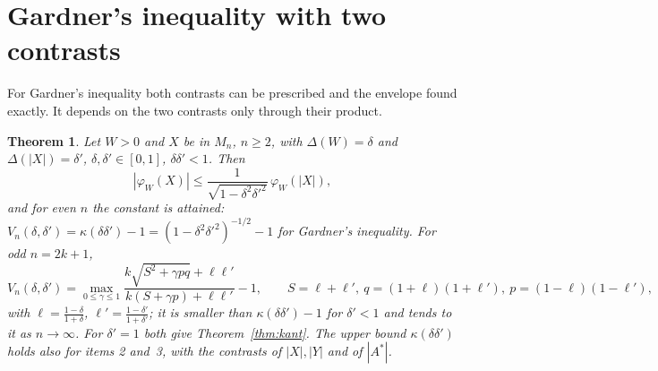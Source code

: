 \documentclass[11pt]{article}
\theoremstyle{plain}
\newtheorem{theorem}{Theorem}[section]
\theoremstyle{definition}
\theoremstyle{remark}
\begin{document}
\section{Gardner's inequality with two contrasts}\label{sec:gardner2}

For Gardner's inequality both contrasts can be prescribed and the envelope found exactly. It depends on the two contrasts
only through their product.

\begin{theorem}\label{thm:gardnerD}
Let $W>0$ and $X$ be in $M_n$, $n\ge2$, with $\Delta(W)=\delta$ and $\Delta(|X|)=\delta'$, $\delta,\delta'\in[0,1]$,
$\delta\delta'<1$. Then
\[
  |\varphi_W(X)|\le\frac{1}{\sqrt{1-\delta^2\delta'^2}}\,\varphi_W(|X|),
\]
and for even $n$ the constant is attained: $V_n(\delta,\delta')=\kappa(\delta\delta')-1=(1-\delta^2\delta'^2)^{-1/2}-1$
for Gardner's inequality. For odd $n=2k+1$,
\[
  V_n(\delta,\delta')=\max_{0\le\gamma\le1}\frac{k\sqrt{S^2+\gamma pq}+\ell\ell'}{k(S+\gamma p)+\ell\ell'}-1,\qquad
  S=\ell+\ell',\ q=(1+\ell)(1+\ell'),\ p=(1-\ell)(1-\ell'),
\]
with $\ell=\frac{1-\delta}{1+\delta}$, $\ell'=\frac{1-\delta'}{1+\delta'}$; it is smaller than $\kappa(\delta\delta')-1$ for
$\delta'<1$ and tends to it as $n\to\infty$. For $\delta'=1$ both give Theorem~\ref{thm:kant}. The upper bound
$\kappa(\delta\delta')$ holds also for items 2 and~3, with the contrasts of $|X|,|Y|$ and of $|A^*|$.
\end{theorem}
\end{document}
